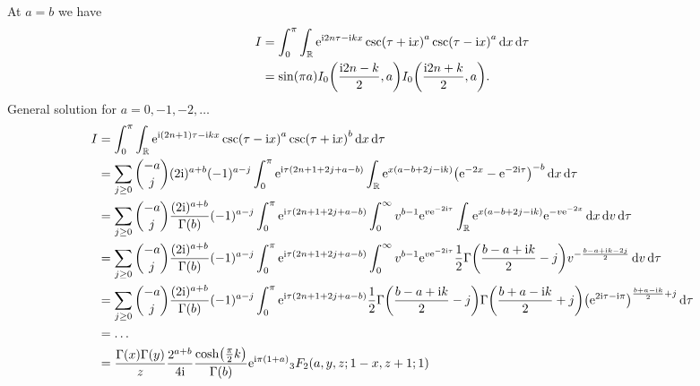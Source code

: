 \documentclass[english, parskip=full]{scrartcl}
\begin{document}
At $a=b$ we have
\begin{align}
I &= \intx{0}{\pi}{\intr{\powe{\i 2n\tau - \i kx} \csc\kla*{\tau + \i x}^a \csc\kla*{\tau - \i x}^a}{x} }{\tau} \\
&= \sin\kla*{\pi a} I_0\kla*{\frac{\i 2n - k}{2}, a} I_0\kla*{\frac{\i 2n + k}{2}, a}.
\end{align}
General solution for $a=0,-1,-2,\dots$
\begin{align}
I &= \intx{0}{\pi}{\intr{\powe{\i (2n+1)\tau-\i kx} \csc(\tau-\i x)^a \csc(\tau + \i x)^b}{x} }{\tau}\\
&= \sum_{j\ge 0} \binom{-a}{j} (2\i)^{a+b} (-1)^{a-j} \intx{0}{\pi}{\powe{\i \tau (2n+1+2j+a-b)} \intr{\powe{x(a-b+2j-\i k)} \kla*{\powe{-2x} - \powe{-2\i\tau}}^{-b} }{x}  }{\tau}\\
&= \sum_{j\ge 0} \binom{-a}{j} \frac{(2\i)^{a+b}}{\Gamma(b)} (-1)^{a-j} \intx{0}{\pi}{\powe{\i \tau (2n+1+2j+a-b)} \intx{0}{\infty}{v^{b-1} \powe{v\powe{-2\i\tau}} \intr{\powe{x(a-b+2j-\i k)} \powe{-v\powe{-2x}} }{x}}{v} }{\tau}\\
&= \sum_{j\ge 0} \binom{-a}{j} \frac{(2\i)^{a+b}}{\Gamma(b)} (-1)^{a-j} \intx{0}{\pi}{\powe{\i \tau (2n+1+2j+a-b)} \intx{0}{\infty}{v^{b-1} \powe{v\powe{-2\i\tau}} \frac{1}{2} \Gamma\kla*{\frac{b-a+\i k}{2} - j} v^{-\frac{b-a+\i k-2j}{2}}}{v} }{\tau}\\
&= \sum_{j\ge 0} \binom{-a}{j} \frac{(2\i)^{a+b}}{\Gamma(b)} (-1)^{a-j} \intx{0}{\pi}{\powe{\i \tau (2n+1+2j+a-b)} \frac{1}{2} \Gamma\kla*{\frac{b-a+\i k}{2} - j} \Gamma\kla*{\frac{b+a-\i k}{2} + j} \kla*{\powe{2\i\tau-\i\pi}}^{\frac{b+a-\i k}{2} + j} }{\tau}\\
&=\dots \\
&= \frac{\Gamma(x)\Gamma(y)}{z} \frac{2^{a+b}}{4\i} \frac{\cosh\kla*{\frac{\pi}{2}k}}{\Gamma(b)} \powe{\i\pi (1+a)} {}_3F_2\kla*{a,y,z;1-x,z+1;1}
\end{align}
\end{document}
